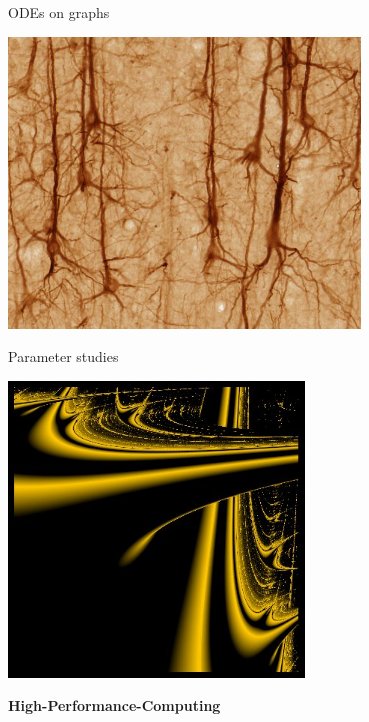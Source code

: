 \begin{frame}
\begin{minipage}{0.48\textwidth}\begin{center}
  ODEs on graphs

  \includegraphics[draft=false,width=0.7\textwidth]{neuron.jpg}
 \end{center}\end{minipage}\pause
\begin{minipage}{0.48\textwidth}\begin{center}
  Parameter studies
 
  \vspace{0.5ex}
  \includegraphics[draft=false,width=0.59\textwidth]{lyap.jpg}
 \end{center} \end{minipage}

 \vspace{2ex}
 \centerline{\bf High-Performance-Computing}


\end{frame}







